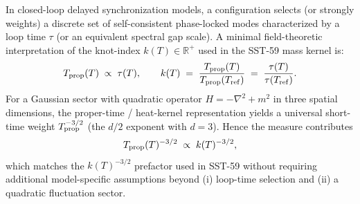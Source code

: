 \documentclass[11pt, a4paper]{article}
\begin{document}
In closed-loop delayed synchronization models, a configuration selects (or strongly
weights) a discrete set of self-consistent phase-locked modes characterized by a loop
time $\tau$ (or an equivalent spectral gap scale). A minimal field-theoretic
interpretation of the knot-index $k(T)\in\mathbb{R}^+$ used in the SST-59 mass kernel is:
\[
    T_{\rm prop}(T) \;\propto\; \tau(T),
    \qquad
    k(T) \;=\; \frac{T_{\rm prop}(T)}{T_{\rm prop}(T_{\rm ref})}
    \;=\; \frac{\tau(T)}{\tau(T_{\rm ref})}.
\]
For a Gaussian sector with quadratic operator $H=-\nabla^2+m^2$ in three spatial dimensions,
the proper-time / heat-kernel representation yields a universal short-time weight
$T_{\rm prop}^{-3/2}$ (the $d/2$ exponent with $d=3$). Hence the measure contributes
\[
    T_{\rm prop}(T)^{-3/2}\;\propto\;k(T)^{-3/2},
\]
which matches the $k(T)^{-3/2}$ prefactor used in SST-59 without requiring additional
model-specific assumptions beyond (i) loop-time selection and (ii) a quadratic fluctuation
sector.
\end{document}
